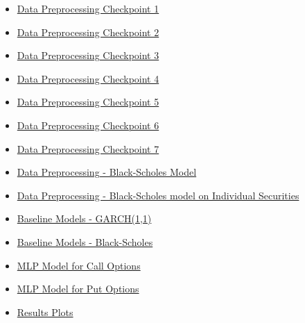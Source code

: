 \documentclass[10pt]{article}
\begin{document}
\begin{itemize}
  \item \href{https://colab.research.google.com/drive/1HeMWjGCQj-xAVBxnDBg6qXo_OX-pYAs1?usp=sharing}{Data Preprocessing Checkpoint 1}
  \item \href{https://colab.research.google.com/drive/1u55O96Ta_LaE7qLtDCZf6g8zyA8UWPO9?usp=sharing}{Data Preprocessing Checkpoint 2}
  \item \href{https://colab.research.google.com/drive/1MKXJ33bUN4k-Ffge3MftOQZNgDVGqW_h?usp=sharing}{Data Preprocessing Checkpoint 3}
  \item \href{https://colab.research.google.com/drive/13x2EyBgopebi3oArXLRMYQGjUKCbo3L3?usp=sharing}{Data Preprocessing Checkpoint 4}
  \item \href{https://colab.research.google.com/drive/1zWTs-i5BKwGLTYSMLkmfqr1Rj4KSEpsy?usp=sharing}{Data Preprocessing Checkpoint 5}
  \item \href{https://colab.research.google.com/drive/1pWdwa8RfqfbnQH-5V2prGx3wMbhMlESW?usp=sharing}{Data Preprocessing Checkpoint 6}
  \item \href{https://colab.research.google.com/drive/1HgYntz5i6Q6S4bpY8tXiFTjAV7C7cp-f?usp=sharing}{Data Preprocessing Checkpoint 7}
  \item \href{https://colab.research.google.com/drive/12KdD33w15luj7t9wdnv57r-9qA8yA34Q?usp=sharingQ}{Data Preprocessing - Black-Scholes Model}
  \item \href{https://colab.research.google.com/drive/1TxcJYcpTQzVPnckIWfbtmfqlK8NBn2Pz?usp=sharing}{Data Preprocessing - Black-Scholes model on Individual Securities}
  \item \href{https://colab.research.google.com/drive/191OuoTBpQzLO_Xz8Bwu8HpFzU-NgTBin?usp=sharing}{Baseline Models - GARCH(1,1)}
  \item \href{https://colab.research.google.com/drive/1-NfN8dnuTuVX1NxqwJdX2o-P0r6aM7Bd?usp=sharing}{Baseline Models - Black-Scholes}
  \item \href{https://colab.research.google.com/drive/1RDi-4RopwcRBYp094BoeJEAYtcHtuHxS?usp=sharing}{MLP Model for Call Options}
  \item \href{https://colab.research.google.com/drive/1UQmmsksDU6tx8cm-BMsMiWxZ-HXJ6s7k?usp=sharing}{MLP Model for Put Options}
  \item \href{https://colab.research.google.com/drive/1nzuaynHSq1otJmYJ0GmhK8pzl7CqCLQb?usp=sharing}{Results Plots}  
\end{itemize}
\end{document}
